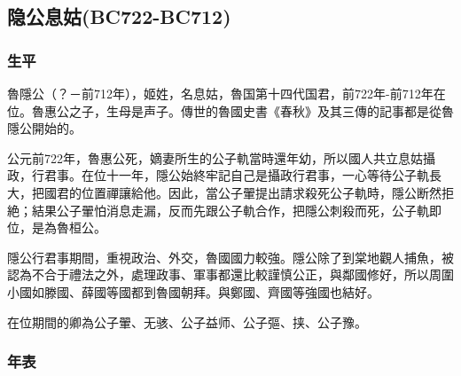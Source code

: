 
\subsection{隐公息姑{\tiny(BC722-BC712)}}

\subsubsection{生平}

魯隱公（？－前712年），姬姓，名息姑，魯国第十四代国君，前722年-前712年在位。魯惠公之子，生母是声子。傳世的魯國史書《春秋》及其三傳的記事都是從魯隱公開始的。

公元前722年，魯惠公死，嫡妻所生的公子軌當時還年幼，所以國人共立息姑攝政，行君事。在位十一年，隱公始終牢記自己是攝政行君事，一心等待公子軌長大，把國君的位置禪讓給他。因此，當公子翬提出請求殺死公子軌時，隱公断然拒絶；結果公子翬怕消息走漏，反而先跟公子軌合作，把隱公刺殺而死，公子軌即位，是為魯桓公。

隱公行君事期間，重視政治、外交，魯國國力較強。隱公除了到棠地觀人捕魚，被認為不合于禮法之外，處理政事、軍事都還比較謹慎公正，與鄰國修好，所以周圍小國如滕國、薛國等國都到魯國朝拜。與鄭國、齊國等強國也結好。

在位期間的卿為公子翬、无骇、公子益师、公子彄、挟、公子豫。

\subsubsection{年表}

